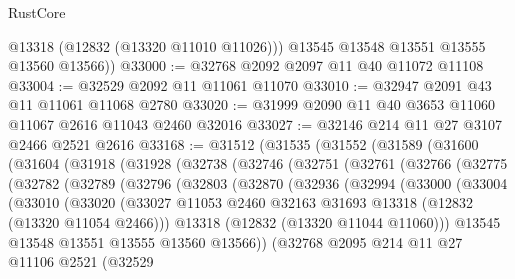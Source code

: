 \begin{lexlean}{RustCore}
\begin{coremodule}
          @13318
          (@12832 (@13320 @11010 @11026)))
        @13545
        @13548
        @13551
        @13555
        @13560
        @13566))
@33000 := @32768 @2092 @2097 @11 @40 @11072 @11108
@33004 := @32529 @2092 @11 @11061 @11070
@33010 := @32947 @2091 @43 @11 @11061 @11068 @2780
@33020 := @31999 @2090 @11 @40 @3653 @11060 @11067 @2616 @11043 @2460 @32016
@33027 := @32146 @214 @11 @27 @3107 @2466 @2521 @2616
@33168 := @31512
    (@31535
      (@31552
        (@31589
          (@31600
            (@31604
              (@31918
                (@31928
                  (@32738
                    (@32746
                      (@32751
                        (@32761
                          (@32766
                            (@32775
                              (@32782
                                (@32789
                                  (@32796
                                    (@32803
                                      (@32870
                                        (@32936
                                          (@32994
                                            (@33000
                                              (@33004
                                                (@33010
                                                  (@33020
                                                    (@33027
                                                      @11053
                                                      @2460
                                                      @32163
                                                      @31693
                                                      @13318
                                                      (@12832 (@13320 @11054 @2466)))
                                                    @13318
                                                    (@12832 (@13320 @11044 @11060)))
                                                  @13545
                                                  @13548
                                                  @13551
                                                  @13555
                                                  @13560
                                                  @13566))
                                              (@32768
                                                @2095
                                                @214
                                                @11
                                                @27
                                                @11106
                                                @2521
                                                (@32529

\end{coremodule}
\end{lexlean}
